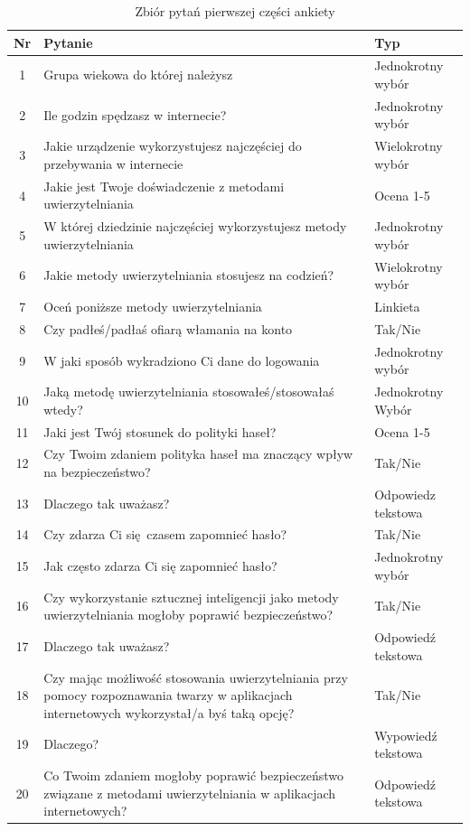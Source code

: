 \begin{table}[htb]
\centering
\caption{Zbiór pytań pierwszej części ankiety}
\label{tab:ankieta-part-1}\small
\begin{tabularx}{\linewidth}{|c|X|X|} 
  \hline
Nr & Pytanie & Typ \\ 
\hline\hline
1 & Grupa wiekowa do której należysz & Jednokrotny wybór \\
2 & Ile godzin spędzasz w internecie? & Jednokrotny wybór \\
3 & Jakie urządzenie wykorzystujesz najczęściej do przebywania w internecie & Wielokrotny wybór \\
4 & Jakie jest Twoje doświadczenie z metodami uwierzytelniania & Ocena 1-5 \\
5 & W której dziedzinie najczęściej wykorzystujesz metody uwierzytelniania & Jednokrotny wybór \\
6 & Jakie metody uwierzytelniania stosujesz na codzień? & Wielokrotny wybór \\
7 & Oceń poniższe metody uwierzytelniania & Linkieta \\
8 & Czy padłeś/padłaś ofiarą włamania na konto & Tak/Nie \\
9 & W jaki sposób wykradziono Ci dane do logowania & Jednokrotny wybór \\
10 & Jaką metodę uwierzytelniania stosowałeś/stosowałaś wtedy? & Jednokrotny Wybór \\
11 & Jaki jest Twój stosunek do polityki haseł? & Ocena 1-5 \\
12 & Czy Twoim zdaniem polityka haseł ma znaczący wpływ na bezpieczeństwo? & Tak/Nie \\
13 & Dlaczego tak uważasz? & Odpowiedz tekstowa \\
14 & Czy zdarza Ci się czasem zapomnieć hasło? & Tak/Nie \\
15 & Jak często zdarza Ci się zapomnieć hasło? & Jednokrotny wybór \\
16 & Czy wykorzystanie sztucznej inteligencji jako metody uwierzytelniania mogłoby poprawić bezpieczeństwo? & Tak/Nie \\
17 & Dlaczego tak uważasz? & Odpowiedź tekstowa \\
18 & Czy mając możliwość stosowania uwierzytelniania przy pomocy rozpoznawania twarzy w aplikacjach internetowych wykorzystał/a byś taką opcję? & Tak/Nie \\
19 & Dlaczego? & Wypowiedź tekstowa \\
20 & Co Twoim zdaniem mogłoby poprawić bezpieczeństwo związane z metodami uwierzytelniania w aplikacjach internetowych? & Odpowiedź tekstowa \\
\hline
\end{tabularx}
\end{table}

